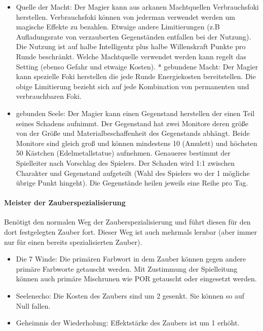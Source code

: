 \documentclass{article}
\begin{document}
\begin{itemize}
\item Quelle der Macht: Der Magier kann aus arkanen Machtquellen Verbrauchsfoki herstellen. Verbrauchsfoki können von jederman verwendet werden um magische Effekte zu bezahlen. Etwaige andere Limitierungen (z.B Aufladungsrate von verzauberten Gegenständen entfallen bei der Nutzung). Die Nutzung ist auf halbe Intelligentz plus halbe Willenskraft Punkte pro Runde beschränkt. Welche Machtquelle verwendet werden kann regelt das Setting (ebenso Gefahr und etwaige Kosten).  * gebundene Macht: Der Magier kann spezielle Foki herstellen die jede Runde Energiekosten bereitstellen. Die obige Limitierung bezieht sich auf jede Kombination von permanenten und verbrauchbaren Foki.
\item gebunden Seele: Der Magier kann einen Gegenstand herstellen der einen Teil seines Schadens aufnimmt. Der Gegenstand hat zwei Monitore deren größe von der Größe und Materialbeschaffenheit des Gegenstands abhängt. Beide Monitore sind gleich groß und können mindestens 10 (Amulett) und höchsten 50 Kästchen (Edelmetallstatue) aufnehmen. Genaueres bestimmt der Spielleiter nach Vorschlag des Spielers. Der Schaden wird 1:1 zwischen Charakter und Gegenstand aufgeteilt (Wahl des Spielers wo der 1 mögliche übrige Punkt hingeht). Die Gegenstände heilen jeweils eine Reihe pro Tag.
\end{itemize}

\paragraph{Meister der Zauberspezialisierung}

Benötigt den normalen Weg der Zauberspezialisierung und führt diesen für den dort festgelegten Zauber fort. Dieser
Weg ist auch mehrmals lernbar (aber immer nur für einen bereits spezialisierten Zauber).

\begin{itemize}
\item Die 7 Winde: Die primären Farbwort in dem Zauber können gegen andere primäre Farbworte getauscht werden. Mit Zustimmung der Spielleitung können auch primäre Mischrunen wie POR getauscht oder eingesetzt werden.
\item Seelenecho: Die Kosten des Zaubers sind um 2 gesenkt. Sie können so auf Null fallen.
\item Geheimnis der Wiederholung: Effektstärke des Zaubers ist um 1 erhöht.
\end{itemize}
\end{document}
